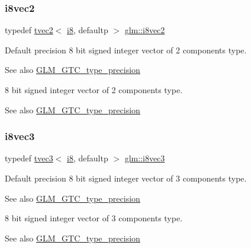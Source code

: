 \subsubsection{\texorpdfstring{i8vec2}{i8vec2}}
{\footnotesize\ttfamily typedef \hyperlink{structglm_1_1tvec2}{tvec2}$<$ \hyperlink{group__gtc__type__precision_gaae064be68b7d36cd7910c16e8ad18bba}{i8}, defaultp $>$ \hyperlink{group__gtc__type__precision_ga277312370b6155b37dbf2a6954c42915}{glm\+::i8vec2}}

Default precision 8 bit signed integer vector of 2 components type. \begin{DoxySeeAlso}{See also}
\hyperlink{group__gtc__type__precision}{G\+L\+M\+\_\+\+G\+T\+C\+\_\+type\+\_\+precision}
\end{DoxySeeAlso}
8 bit signed integer vector of 2 components type. \begin{DoxySeeAlso}{See also}
\hyperlink{group__gtc__type__precision}{G\+L\+M\+\_\+\+G\+T\+C\+\_\+type\+\_\+precision} 
\end{DoxySeeAlso}
\mbox{\label{group__gtc__type__precision_ga97a6cae79db311cdd47c4e88a5855987}} 
\subsubsection{\texorpdfstring{i8vec3}{i8vec3}}
{\footnotesize\ttfamily typedef \hyperlink{structglm_1_1tvec3}{tvec3}$<$ \hyperlink{group__gtc__type__precision_gaae064be68b7d36cd7910c16e8ad18bba}{i8}, defaultp $>$ \hyperlink{group__gtc__type__precision_ga97a6cae79db311cdd47c4e88a5855987}{glm\+::i8vec3}}

Default precision 8 bit signed integer vector of 3 components type. \begin{DoxySeeAlso}{See also}
\hyperlink{group__gtc__type__precision}{G\+L\+M\+\_\+\+G\+T\+C\+\_\+type\+\_\+precision}
\end{DoxySeeAlso}
8 bit signed integer vector of 3 components type. \begin{DoxySeeAlso}{See also}
\hyperlink{group__gtc__type__precision}{G\+L\+M\+\_\+\+G\+T\+C\+\_\+type\+\_\+precision} 
\end{DoxySeeAlso}
\mbox{\label{group__gtc__type__precision_gafbf10a778016eba57d44beb585f2dc49}} 
